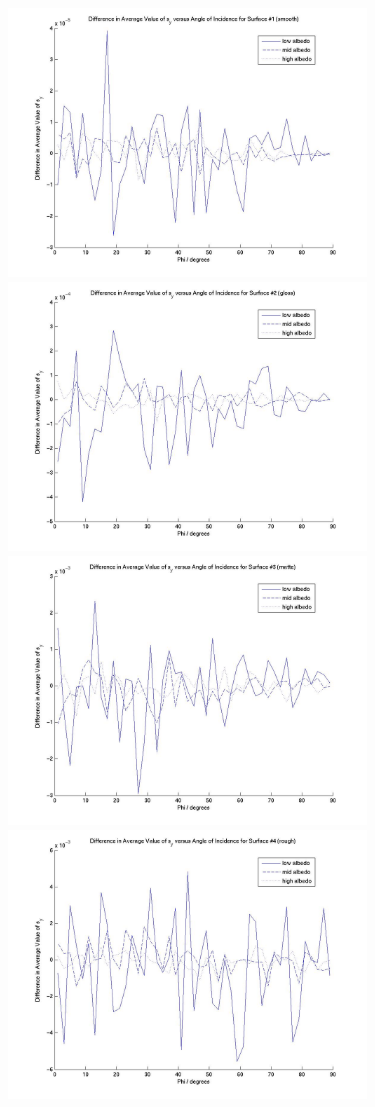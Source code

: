 \begin{description}
      \begin{figure}[!ht]
        \includegraphics[width=95mm]{figs/sda/unit_vec_diff__y_smooth.jpg}
        \includegraphics[width=95mm]{figs/sda/unit_vec_diff__y__gloss.jpg}
        \includegraphics[width=95mm]{figs/sda/unit_vec_diff__y__matte.jpg}
        \includegraphics[width=95mm]{figs/sda/unit_vec_diff__y__rough.jpg}

\end{figure}
\end{description}
